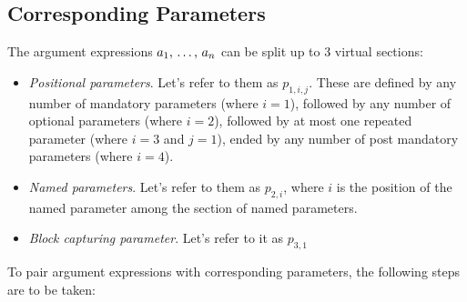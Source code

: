 \subsection{Corresponding Parameters}
\label{sec:corresponding-parameters}

The argument expressions $a_1 ,\, \ldots ,\, a_n$ can be split up to 3 virtual sections: 
\begin{itemize}

\item[] {\em Positional parameters}. Let's refer to them as $p_{1,i,j}$. These are defined by any number of mandatory parameters (where $i = 1$), followed by any number of optional parameters (where $i = 2$), followed by at most one repeated parameter (where $i = 3$ and $j = 1$), ended by any number of post mandatory parameters (where $i = 4$). 

\item[] {\em Named parameters}. Let's refer to them as $p_{2,i}$, where $i$ is the position of the named parameter among the section of named parameters. 

\item[] {\em Block capturing parameter}. Let's refer to it as $p_{3,1}$

\end{itemize}
To pair argument expressions with corresponding parameters, the following steps are to be taken:
